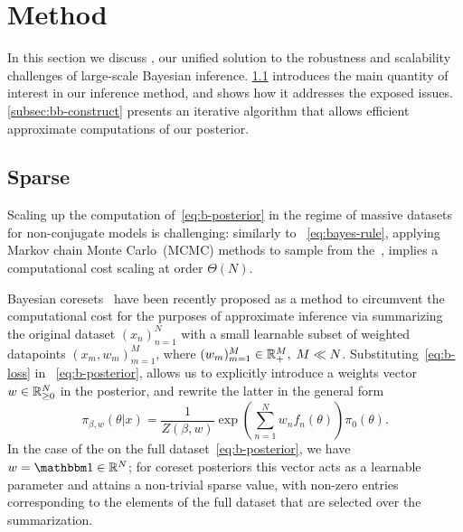 \section{Method}
\label{sec:method}

In this section we discuss \bcores, our unified solution to the robustness and scalability challenges of large-scale Bayesian inference. \cref{subsec:sparse-b-posterior} introduces the main quantity of interest in our inference method, and shows how it addresses the exposed issues. \cref{subsec:bb-construct} presents an iterative algorithm that allows efficient approximate computations of our posterior.


\subsection{Sparse \bpost{}}
\label{subsec:sparse-b-posterior}


Scaling up the computation of~\cref{eq:b-posterior} in the regime of massive datasets for non-conjugate models is challenging:
similarly to  ~\cref{eq:bayes-rule}, applying Markov chain Monte Carlo~(MCMC) methods to sample from the~\bpost{}, implies a computational cost scaling at order $\Theta(N)$. 

Bayesian coresets~\cite{huggins16,campbell19jmlr} have been recently proposed as a method to circumvent the computational cost for the purposes of approximate inference via summarizing the original dataset  $(x_n)_{n=1}^{N}$ with a small learnable subset of weighted datapoints $(x_m, w_m)_{m=1}^{M}$, where  $(w_m)_{m=1}^{M} \in \mathbb{R}^{M}_{+},\; M \ll N$. 
Substituting~\cref{eq:b-loss} in ~\cref{eq:b-posterior}, allows us to explicitly introduce a weights vector $ w \in \mathbb{R}_{\geq 0}^{N}$ in the posterior, and rewrite the latter in the general form
\[
\pi_{\beta,w}(\theta|x) 
= \frac{1}{Z(\beta, w)}  \exp\left(\sum_{n=1}^{N}w_nf_n(\theta)\right)\pi_0(\theta).
\label{eq:bcore-posterior}
\]
In the case of the \bpost{} on the full dataset~\cref{eq:b-posterior}, we have $w=\vecone \in\reals^{N}$; for coreset posteriors this vector acts as a learnable parameter and attains a non-trivial sparse value, with non-zero entries corresponding to the elements of the full dataset that are selected over the summarization.

